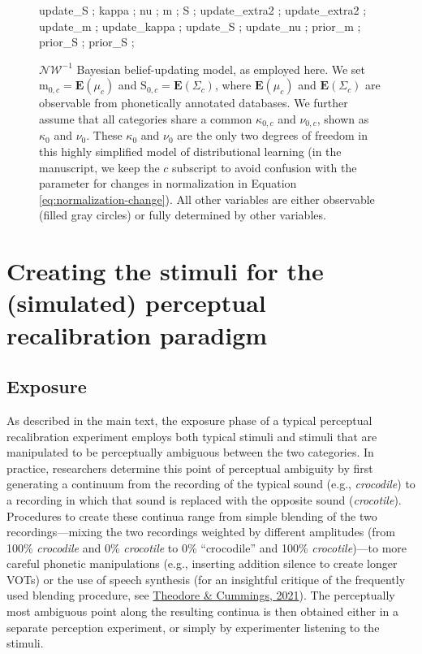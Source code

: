 \documentclass[
  11pt,
  man,floatsintext]{apa6}
\begin{document}
\begin{figure}
{     {update_S} ; %
     {kappa} ; %
     {nu} ; %
     {m} ; %
     {S} ; %
     {update_extra2} ; %
     {update_extra2} ; %
     {update_m} ; %
     {update_kappa} ; %
     {update_S} ; %
     {update_nu} ; %
     {prior_m} ;
     {prior_S} ;
     {prior_S} ;
  }
  \caption{$\mathcal{NW}^{-1}$ Bayesian belief-updating model, as employed here. We set $\mathrm{m}_{0,c} = \mathbf{E}(\mu_c)$ and $\mathrm{S}_{0,c}=\mathbf{E}(\Sigma_c)$, where $\mathbf{E}(\mu_c)$ and $\mathbf{E}(\Sigma_c)$ are observable from phonetically annotated databases. We further assume that all categories share a common $\kappa_{0,c}$ and $\nu_{0,c}$, shown as $\kappa_{0}$ and $\nu_{0}$. These $\kappa_{0}$ and $\nu_{0}$ are the only two degrees of freedom in this highly simplified model of distributional learning (in the manuscript, we keep the $c$ subscript to avoid confusion with the parameter for changes in normalization in Equation \ref{eq:normalization-change}). All other variables are either observable (filled gray circles) or fully determined by other variables.}\label{fig:model-belief-updating}
\end{figure}

\hypertarget{sec:SI-PR}{%
\section{Creating the stimuli for the (simulated) perceptual recalibration paradigm}\label{sec:SI-PR}}

\hypertarget{exposure}{%
\subsection{Exposure}\label{exposure}}

As described in the main text, the exposure phase of a typical perceptual recalibration experiment employs both typical stimuli and stimuli that are manipulated to be perceptually ambiguous between the two categories. In practice, researchers determine this point of perceptual ambiguity by first generating a continuum from the recording of the typical sound (e.g., \emph{crocodile}) to a recording in which that sound is replaced with the opposite sound (\emph{crocotile}). Procedures to create these continua range from simple blending of the two recordings---mixing the two recordings weighted by different amplitudes (from 100\% \emph{crocodile} and 0\% \emph{crocotile} to 0\% ``crocodile'' and 100\% \emph{crocotile})---to more careful phonetic manipulations (e.g., inserting addition silence to create longer VOTs) or the use of speech synthesis (for an insightful critique of the frequently used blending procedure, see \protect\hyperlink{ref-theodore-cummings2021}{Theodore \& Cummings, 2021}). The perceptually most ambiguous point along the resulting continua is then obtained either in a separate perception experiment, or simply by experimenter listening to the stimuli.
\end{document}
